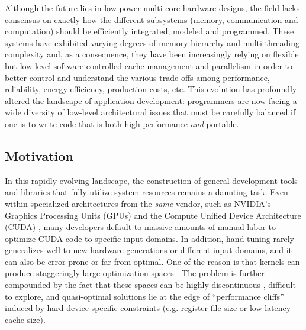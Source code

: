 \documentclass{sig-alternate}
\begin{document}

Although the future lies in low-power multi-core hardware designs, the field
lacks consensus on exactly how the different subsystems (memory,
communication and computation) should be efficiently integrated, modeled and
programmed. These systems have exhibited varying degrees of memory hierarchy
and multi-threading complexity and, as a consequence, they have been
increasingly relying on flexible but low-level software-controlled cache
management and parallelism \citep{asanovic2006landscape} in order to better
control and understand the various trade-offs among performance, reliability,
energy efficiency, production costs, etc. This evolution has profoundly
altered the landscape of application development: programmers are now
facing a wide diversity of low-level architectural issues
that must be carefully balanced if one is to write code that is both
high-performance \emph{and} portable.

\subsection{Motivation}


In this rapidly evolving landscape, the construction of general
development tools and libraries that fully utilize system resources
remains a daunting task. Even within specialized architectures from the
\emph{same} vendor, such as NVIDIA's Graphics Processing Units (GPUs) and the
Compute Unified Device Architecture (CUDA) \citep{nickolls2008scalable,
nvidia2011cuda}, many developers default to massive amounts of manual labor
to optimize CUDA code to specific input domains. In addition, hand-tuning
rarely generalizes well to new hardware generations or different input
domains, and it can also be error-prone or far from optimal. One of the
reason is that kernels can produce staggeringly large optimization spaces
\citep{datta2008stencil}. The problem is further compounded by the fact that
these spaces can be highly discontinuous \citep{ryoo2008program}, difficult
to explore, and quasi-optimal solutions lie at the edge of ``performance
cliffs'' induced by hard device-specific constraints (e.g. register file
size or low-latency cache size).
\end{document}

